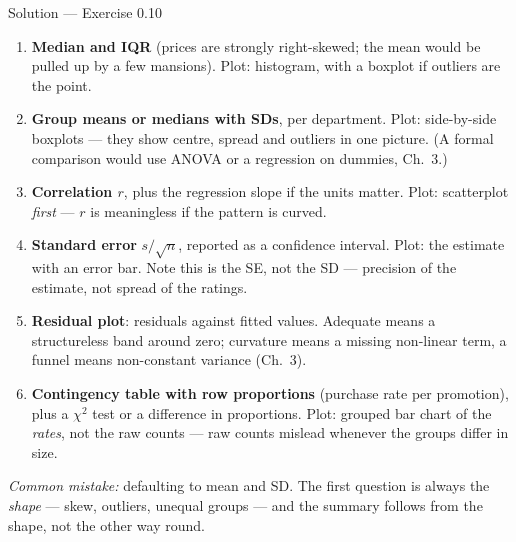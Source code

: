 \documentclass[aspectratio=169,11pt]{beamer}
\begin{document}
\begin{frame}{Solution --- Exercise 0.10}
  \begin{solutionbox}
    \scriptsize
    \begin{enumerate}
      \item \textbf{Median and IQR} (prices are strongly right-skewed; the
            mean would be pulled up by a few mansions). Plot: histogram, with
            a boxplot if outliers are the point.
      \item \textbf{Group means or medians with SDs}, per department. Plot:
            side-by-side boxplots --- they show centre, spread and outliers in
            one picture. (A formal comparison would use ANOVA or a
            regression on dummies, Ch.\ 3.)
      \item \textbf{Correlation $r$}, plus the regression slope if the units
            matter. Plot: scatterplot \emph{first} --- $r$ is meaningless if
            the pattern is curved.
      \item \textbf{Standard error} $s/\sqrt n$, reported as a confidence
            interval. Plot: the estimate with an error bar. Note this is the
            SE, not the SD --- precision of the estimate, not spread of the
            ratings.
      \item \textbf{Residual plot}: residuals against fitted values. Adequate
            means a structureless band around zero; curvature means a missing
            non-linear term, a funnel means non-constant variance (Ch.\ 3).
      \item \textbf{Contingency table with row proportions} (purchase rate per
            promotion), plus a $\chi^2$ test or a difference in proportions.
            Plot: grouped bar chart of the \emph{rates}, not the raw counts ---
            raw counts mislead whenever the groups differ in size.
    \end{enumerate}

    \smallskip
    \textit{Common mistake:} defaulting to mean and SD. The first question
    is always the \emph{shape} --- skew, outliers, unequal groups --- and
    the summary follows from the shape, not the other way round.
  \end{solutionbox}
\end{frame}
\end{document}
